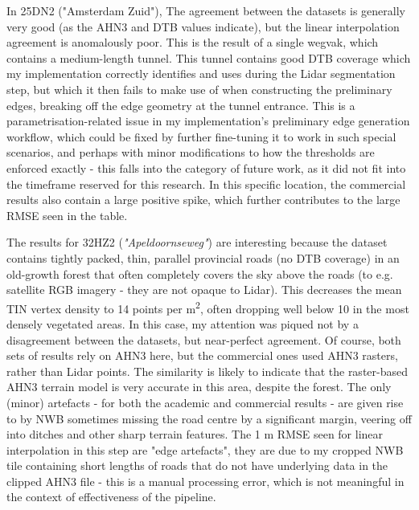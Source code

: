 In 25DN2 ("Amsterdam Zuid"), The agreement between the datasets is generally very good (as the AHN3 and DTB values indicate), but the linear interpolation agreement is anomalously poor. This is the result of a single wegvak, which contains a medium-length tunnel. This tunnel contains good DTB coverage which my implementation correctly identifies and uses during the Lidar segmentation step, but which it then fails to make use of when constructing the preliminary edges, breaking off the edge geometry at the tunnel entrance. This is a parametrisation-related issue in my implementation's preliminary edge generation workflow, which could be fixed by further fine-tuning it to work in such special scenarios, and perhaps with minor modifications to how the thresholds are enforced exactly - this falls into the category of future work, as it did not fit into the timeframe reserved for this research. In this specific location, the commercial results also contain a large positive spike, which further contributes to the large RMSE seen in the table.

The results for 32HZ2 (\textit{"Apeldoornseweg"}) are interesting because the dataset contains tightly packed, thin, parallel provincial roads (no DTB coverage) in an old-growth forest that often completely covers the sky above the roads (to e.g. satellite RGB imagery - they are not opaque to Lidar). This decreases the mean TIN vertex density to 14 points per m\textsuperscript{2}, often dropping well below 10 in the most densely vegetated areas. In this case, my attention was piqued not by a disagreement between the datasets, but near-perfect agreement. Of course, both sets of results rely on AHN3 here, but the commercial ones used AHN3 rasters, rather than Lidar points. The similarity is likely to indicate that the raster-based AHN3 terrain model is very accurate in this area, despite the forest. The only (minor) artefacts - for both the academic and commercial results - are given rise to by NWB sometimes missing the road centre by a significant margin, veering off into ditches and other sharp terrain features. The 1 m RMSE seen for linear interpolation in this step are "edge artefacts", they are due to my cropped NWB tile containing short lengths of roads that do not have underlying data in the clipped AHN3 file - this is a manual processing error, which is not meaningful in the context of effectiveness of the pipeline.

